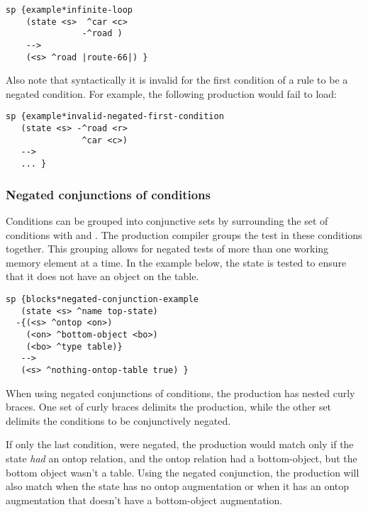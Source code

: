 \begin{verbatim}
sp {example*infinite-loop
    (state <s>  ^car <c>
               -^road )
    -->
    (<s> ^road |route-66|) }
\end{verbatim}

Also note that syntactically it is invalid for the first condition of a rule
to be a negated condition. For example, the following production would fail
to load:

\begin{verbatim}
sp {example*invalid-negated-first-condition
   (state <s> -^road <r>
               ^car <c>)
   -->
   ... }
\end{verbatim}

\subsubsection{Negated conjunctions of conditions}
\label{SYNTAX-pm-negaconj}      %

Conditions can be grouped into conjunctive sets by surrounding the set of
conditions with \soar{\{} and \soar{\}}. The production compiler groups the
test in these conditions together. This grouping allows for negated tests of
more than one working memory element at a time. In the example below, the
state is tested to ensure that it does not have an object on the table. 

\begin{verbatim}
sp {blocks*negated-conjunction-example
   (state <s> ^name top-state)
  -{(<s> ^ontop <on>)
    (<on> ^bottom-object <bo>)
    (<bo> ^type table)}
   -->
   (<s> ^nothing-ontop-table true) } 
\end{verbatim}

When using negated conjunctions of conditions, the production has
nested curly braces. One set of curly braces delimits the production, while
the other set delimits the conditions to be conjunctively negated.

If only the last condition,  were negated, the
production would match only if the state \emph{had} an ontop relation, and the
ontop relation had a bottom-object, but the bottom object wasn't a table.
Using the negated conjunction, the production will also match when the state
has no ontop augmentation or when it has an ontop augmentation that doesn't
have a bottom-object augmentation.

